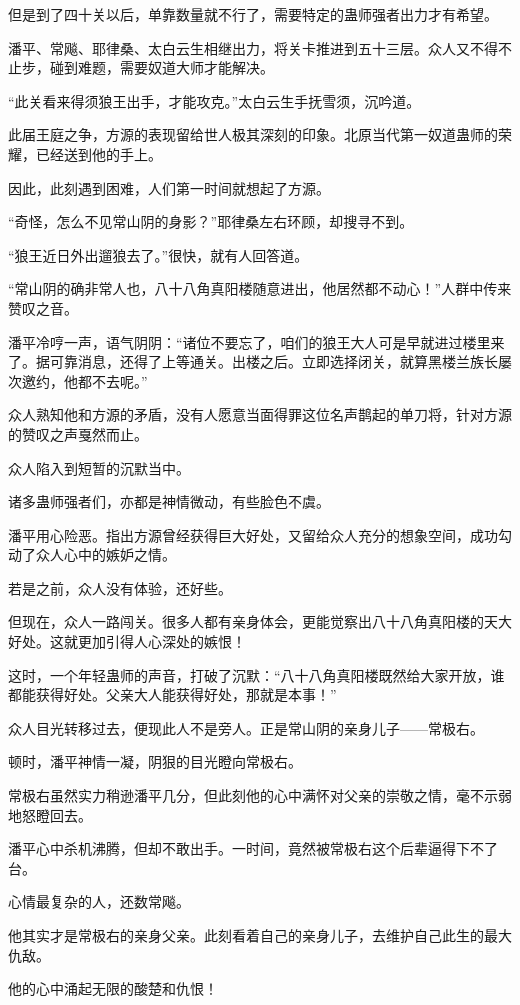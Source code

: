 \begin{this_body}
但是到了四十关以后，单靠数量就不行了，需要特定的蛊师强者出力才有希望。

潘平、常飚、耶律桑、太白云生相继出力，将关卡推进到五十三层。众人又不得不止步，碰到难题，需要奴道大师才能解决。

“此关看来得须狼王出手，才能攻克。”太白云生手抚雪须，沉吟道。

此届王庭之争，方源的表现留给世人极其深刻的印象。北原当代第一奴道蛊师的荣耀，已经送到他的手上。

因此，此刻遇到困难，人们第一时间就想起了方源。

“奇怪，怎么不见常山阴的身影？”耶律桑左右环顾，却搜寻不到。

“狼王近日外出遛狼去了。”很快，就有人回答道。

“常山阴的确非常人也，八十八角真阳楼随意进出，他居然都不动心！”人群中传来赞叹之音。

潘平冷哼一声，语气阴阴：“诸位不要忘了，咱们的狼王大人可是早就进过楼里来了。据可靠消息，还得了上等通关。出楼之后。立即选择闭关，就算黑楼兰族长屡次邀约，他都不去呢。”

众人熟知他和方源的矛盾，没有人愿意当面得罪这位名声鹊起的单刀将，针对方源的赞叹之声戛然而止。

众人陷入到短暂的沉默当中。

诸多蛊师强者们，亦都是神情微动，有些脸色不虞。

潘平用心险恶。指出方源曾经获得巨大好处，又留给众人充分的想象空间，成功勾动了众人心中的嫉妒之情。

若是之前，众人没有体验，还好些。

但现在，众人一路闯关。很多人都有亲身体会，更能觉察出八十八角真阳楼的天大好处。这就更加引得人心深处的嫉恨！

这时，一个年轻蛊师的声音，打破了沉默：“八十八角真阳楼既然给大家开放，谁都能获得好处。父亲大人能获得好处，那就是本事！”

众人目光转移过去，便现此人不是旁人。正是常山阴的亲身儿子——常极右。

顿时，潘平神情一凝，阴狠的目光瞪向常极右。

常极右虽然实力稍逊潘平几分，但此刻他的心中满怀对父亲的崇敬之情，毫不示弱地怒瞪回去。

潘平心中杀机沸腾，但却不敢出手。一时间，竟然被常极右这个后辈逼得下不了台。

心情最复杂的人，还数常飚。

他其实才是常极右的亲身父亲。此刻看着自己的亲身儿子，去维护自己此生的最大仇敌。

他的心中涌起无限的酸楚和仇恨！


\end{this_body}
